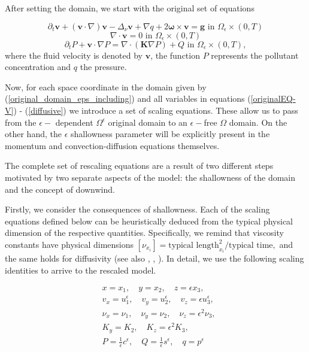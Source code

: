 \documentclass[11pt, a4paper]{article}
\begin{document}
After setting the domain, we start with the original set of equations

\begin{equation} \label{originalEQ-V}
\partial_t \mathbf{v} + (\mathbf{v} \cdot \nabla)\mathbf{v} -\Delta_{\nu} \mathbf{v} + \nabla q + 2 \mathbf{\omega} \times \mathbf{v}= \mathbf{g} \text{ in } \Omega_{\epsilon} \times (0,T)
\end{equation}
%
\begin{equation} \label{originalEQ-I}
\nabla \cdot \mathbf{v} = 0 \text{ in } \Omega_{\epsilon} \times (0,T)
\end{equation}
%
\begin{equation} \label{diffusive}
\partial_t P + \mathbf{v} \cdot \nabla P = \nabla \cdot (\mathbf{K} \nabla P) + Q \text{ in } \Omega_{\epsilon} \times (0,T),
\end{equation}
%
where the fluid velocity is denoted by $\mathbf{v}$, the function $P$ represents the pollutant concentration and $q$ the pressure.

Now, for each space coordinate in the domain given by (\ref{original_domain_eps_including}) and all variables in equations (\ref{originalEQ-V}) - (\ref{diffusive}) we introduce a set of scaling equations. These allow us to pass from the $\epsilon-$ dependent $\Omega^\epsilon$ original domain to an $\epsilon-$free $\Omega$ domain. On the other hand, the $\epsilon$ shallowness parameter will be explicitly present in the momentum and convection-diffusion equations themselves.

The complete set of rescaling equations are a result of two different steps motivated by two separate aspects of the model: the shallowness of the domain and the concept of downwind.

Firstly, we consider the consequences of shallowness. Each of the scaling equations defined below can be heuristically deduced from the typical physical dimension of the respective quantities. Specifically, we remind that viscosity constants have physical dimensions $[\nu_{x_i}] = \text{typical length}_{x_i}^2 / \text{typical time},$ and the same holds for diffusivity (see also \cite{azerad2001mathematical}, \cite{besson1992some}, \cite{pollatmws2019}). In detail, we use the following scaling identities to arrive to the rescaled model.

\begin{equation} \label{shallownessscalingeqs}
\begin{split}
& x = x_1, \quad y = x_2, \quad z = \epsilon x_3, \\
& v_x = u_1^{\epsilon}, \quad v_y = u_2^{\epsilon}, \quad v_z = \epsilon u_3^{\epsilon}, \\
& \nu_x = \nu_1, \quad \nu_y = \nu_2 , \quad \nu_z = \epsilon ^ 2\nu_3, \\
& K_y = K_2 , \quad K_z = \epsilon^2 K_3, \\
& P = \frac{1}{\epsilon} c^\epsilon, \quad Q = \frac{1}{\epsilon} s^\epsilon, \quad q = p^{\epsilon}
\end{split}
\end{equation}
\end{document}
